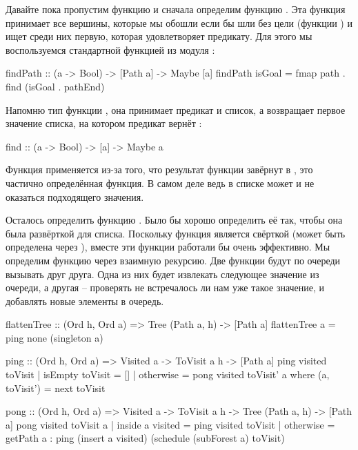 Давайте пока пропустим функцию  и сначала 
определим функцию .
Эта функция принимает все вершины, которые мы обошли
если бы шли без цели (функции ) и ищет среди
них первую, которая удовлетворяет предикату. Для этого мы
воспользуемся стандартной функцией  из 
модуля :


\begin{code}
findPath :: (a -> Bool) -> [Path a] -> Maybe [a]
findPath isGoal =  fmap path . find (isGoal . pathEnd)
\end{code}

Напомню тип функции , она принимает предикат
и список, а возвращает первое значение списка, на котором
предикат вернёт :

\begin{code}
find :: (a -> Bool) -> [a] -> Maybe a
\end{code}

Функция  применяется из-за того, что результат
функции  завёрнут в , это частично
определённая функция. В самом деле ведь в списке может и 
не оказаться подходящего значения. 

Осталось определить функцию . Было бы 
хорошо определить её так, чтобы она была развёрткой для
списка. Поскольку функция  является свёрткой
(может быть определена через ), вместе эти функции
работали бы очень эффективно. Мы определим функцию 
через взаимную рекурсию. Две функции будут
по очереди вызывать друг друга. Одна из них будет 
извлекать следующее значение из очереди, а другая --
проверять не встречалось ли нам уже такое значение,
и добавлять новые элементы в очередь.

\begin{code}
flattenTree :: (Ord h, Ord a) => Tree (Path a, h) -> [Path a]
flattenTree a = ping none (singleton a) 

ping :: (Ord h, Ord a) => Visited a -> ToVisit a h -> [Path a]
ping visited toVisit 
    | isEmpty toVisit = []
    | otherwise       = pong visited toVisit' a
    where (a, toVisit') = next toVisit


pong :: (Ord h, Ord a) 
    => Visited a -> ToVisit a h -> Tree (Path a, h) -> [Path a]
pong visited toVisit a 
    | inside a visited  = ping visited toVisit
    | otherwise         = getPath a : 
        ping (insert a visited) (schedule (subForest a) toVisit)
\end{code}

